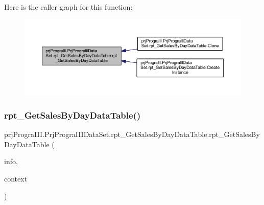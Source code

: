 Here is the caller graph for this function\+:
\nopagebreak
\begin{figure}[H]
\begin{center}
\leavevmode
\includegraphics[width=350pt]{classprj_progra_i_i_i_1_1_prj_progra_i_i_i_data_set_1_1rpt___get_sales_by_day_data_table_acca9559343110b5b458f9d372477b9bd_icgraph}
\end{center}
\end{figure}
\hypertarget{classprj_progra_i_i_i_1_1_prj_progra_i_i_i_data_set_1_1rpt___get_sales_by_day_data_table_ad442bf7f27bdd0f8ba22d80e32aa9665}{}\label{classprj_progra_i_i_i_1_1_prj_progra_i_i_i_data_set_1_1rpt___get_sales_by_day_data_table_ad442bf7f27bdd0f8ba22d80e32aa9665} 
\subsubsection{\texorpdfstring{rpt\+\_\+\+Get\+Sales\+By\+Day\+Data\+Table()}{rpt\_GetSalesByDayDataTable()}\hspace{0.1cm}{\footnotesize\ttfamily [2/2]}}
{\footnotesize\ttfamily prj\+Progra\+I\+I\+I.\+Prj\+Progra\+I\+I\+I\+Data\+Set.\+rpt\+\_\+\+Get\+Sales\+By\+Day\+Data\+Table.\+rpt\+\_\+\+Get\+Sales\+By\+Day\+Data\+Table (\begin{DoxyParamCaption}\item[{global\+::\+System.\+Runtime.\+Serialization.\+Serialization\+Info}]{info,  }\item[{global\+::\+System.\+Runtime.\+Serialization.\+Streaming\+Context}]{context }\end{DoxyParamCaption})\hspace{0.3cm}{\ttfamily [protected]}}



